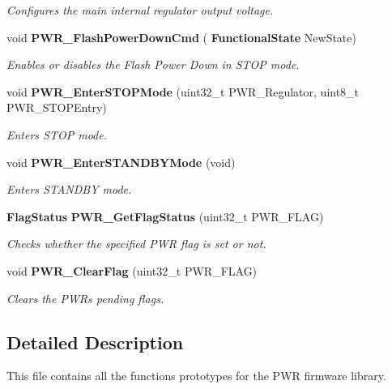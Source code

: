 \begin{DoxyCompactItemize}
\begin{DoxyCompactList}\small\item\em Configures the main internal regulator output voltage. \end{DoxyCompactList}\item 
void \textbf{ P\+W\+R\+\_\+\+Flash\+Power\+Down\+Cmd} (\textbf{ Functional\+State} New\+State)
\begin{DoxyCompactList}\small\item\em Enables or disables the Flash Power Down in S\+T\+OP mode. \end{DoxyCompactList}\item 
void \textbf{ P\+W\+R\+\_\+\+Enter\+S\+T\+O\+P\+Mode} (uint32\+\_\+t P\+W\+R\+\_\+\+Regulator, uint8\+\_\+t P\+W\+R\+\_\+\+S\+T\+O\+P\+Entry)
\begin{DoxyCompactList}\small\item\em Enters S\+T\+OP mode. \end{DoxyCompactList}\item 
void \textbf{ P\+W\+R\+\_\+\+Enter\+S\+T\+A\+N\+D\+B\+Y\+Mode} (void)
\begin{DoxyCompactList}\small\item\em Enters S\+T\+A\+N\+D\+BY mode. \end{DoxyCompactList}\item 
\textbf{ Flag\+Status} \textbf{ P\+W\+R\+\_\+\+Get\+Flag\+Status} (uint32\+\_\+t P\+W\+R\+\_\+\+F\+L\+AG)
\begin{DoxyCompactList}\small\item\em Checks whether the specified P\+WR flag is set or not. \end{DoxyCompactList}\item 
void \textbf{ P\+W\+R\+\_\+\+Clear\+Flag} (uint32\+\_\+t P\+W\+R\+\_\+\+F\+L\+AG)
\begin{DoxyCompactList}\small\item\em Clears the P\+WR\textquotesingle{}s pending flags. \end{DoxyCompactList}\end{DoxyCompactItemize}


\subsection{Detailed Description}
This file contains all the functions prototypes for the P\+WR firmware library. 

